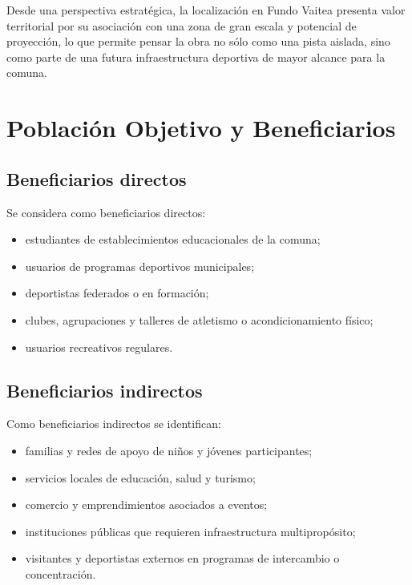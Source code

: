 \documentclass[12pt,letterpaper]{article}
\begin{document}
Desde una perspectiva estratégica, la localización en Fundo Vaitea presenta valor territorial por su asociación con una zona de gran escala y potencial de proyección, lo que permite pensar la obra no sólo como una pista aislada, sino como parte de una futura infraestructura deportiva de mayor alcance para la comuna.

\section{Población Objetivo y Beneficiarios}

\subsection{Beneficiarios directos}

Se considera como beneficiarios directos:

\begin{itemize}
    \item estudiantes de establecimientos educacionales de la comuna;
    \item usuarios de programas deportivos municipales;
    \item deportistas federados o en formación;
    \item clubes, agrupaciones y talleres de atletismo o acondicionamiento físico;
    \item usuarios recreativos regulares.
\end{itemize}

\subsection{Beneficiarios indirectos}

Como beneficiarios indirectos se identifican:

\begin{itemize}
    \item familias y redes de apoyo de niños y jóvenes participantes;
    \item servicios locales de educación, salud y turismo;
    \item comercio y emprendimientos asociados a eventos;
    \item instituciones públicas que requieren infraestructura multipropósito;
    \item visitantes y deportistas externos en programas de intercambio o concentración.
\end{itemize}
\end{document}
